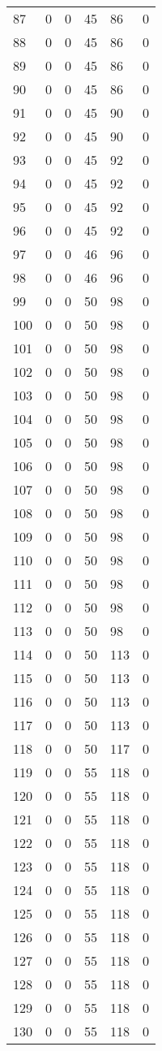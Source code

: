 \documentclass[a4paper]{ctexart}
\begin{document}
\begin{longtable}{p{1cm}|p{2cm}|p{2cm}|p{2cm}|P{2cm}|p{2cm}}
		87&0&0&45&86&0\\
		88&0&0&45&86&0\\
		89&0&0&45&86&0\\
		90&0&0&45&86&0\\
		91&0&0&45&90&0\\
		92&0&0&45&90&0\\
		93&0&0&45&92&0\\
		94&0&0&45&92&0\\
		95&0&0&45&92&0\\
		96&0&0&45&92&0\\
		97&0&0&46&96&0\\
		98&0&0&46&96&0\\
		99&0&0&50&98&0\\
		100&0&0&50&98&0\\
		101&0&0&50&98&0\\
		102&0&0&50&98&0\\
		103&0&0&50&98&0\\
		104&0&0&50&98&0\\
		105&0&0&50&98&0\\
		106&0&0&50&98&0\\
		107&0&0&50&98&0\\
		108&0&0&50&98&0\\
		109&0&0&50&98&0\\
		110&0&0&50&98&0\\
		111&0&0&50&98&0\\
		112&0&0&50&98&0\\
		113&0&0&50&98&0\\
		114&0&0&50&113&0\\
		115&0&0&50&113&0\\
		116&0&0&50&113&0\\
		117&0&0&50&113&0\\
		118&0&0&50&117&0\\
		119&0&0&55&118&0\\
		120&0&0&55&118&0\\
		121&0&0&55&118&0\\
		122&0&0&55&118&0\\
		123&0&0&55&118&0\\
		124&0&0&55&118&0\\
		125&0&0&55&118&0\\
		126&0&0&55&118&0\\
		127&0&0&55&118&0\\
		128&0&0&55&118&0\\
		129&0&0&55&118&0\\
		130&0&0&55&118&0\\

\end{longtable}
\end{document}
